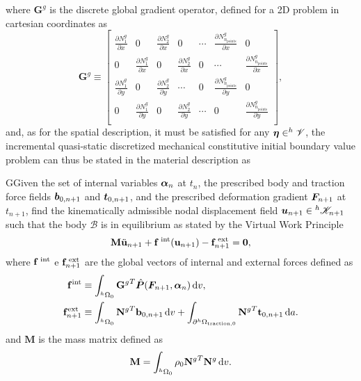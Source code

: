 where $\mathbf G^g$ is the discrete global gradient operator, defined for a 2D problem in cartesian coordinates as
\begin{equation}
    \mathbf G^g\equiv \left[
    \begin{array}{ccccccc}
         \displaystyle{\frac{\partial N_1^g}{\partial x}} & 0 & \displaystyle{\frac{\partial N_2^g}{\partial x}} & 0 & \cdots &
         \displaystyle{\frac{\partial N_{n_\text{points}}^g}{\partial x}} & 0\\
         0 & \displaystyle{\frac{\partial N_1^g}{\partial x}} & 0 & \displaystyle{\frac{\partial N_2^g}{\partial x}} & 0 & \cdots &
         \displaystyle{\frac{\partial N_{n_\text{points}}^g}{\partial x}}\\
         \displaystyle{\frac{\partial N_1^g}{\partial y}} & 0 & \displaystyle{\frac{\partial N_2^g}{\partial y}} & \cdots &
         0 & \displaystyle{\frac{\partial N_{n_\text{points}}^g}{\partial y}} & 0\\
         0 & \displaystyle{\frac{\partial N_1^g}{\partial y}} & 0 & \displaystyle{\frac{\partial N_2^g}{\partial y}} & \cdots &
         0 & \displaystyle{\frac{\partial N_{n_\text{points}}^g}{\partial y}}\\
    \end{array}
    \right],
\end{equation}
and, as for the spatial description, it must  be satisfied for any $\bm{\eta} \in ^h \mathscr{V}$, the incremental quasi-static discretized mechanical constitutive initial boundary value problem can thus be stated in the material description as
\begin{problem}
GGiven the set of internal variables $\bm{\alpha}_n$ at $t_n$, the prescribed body and traction force fields $\bm{b}_{0,n+1}$ and $\bm{t}_{0,n+1}$, and the prescribed deformation gradient $\bm{F}_{n+1}$ at $t_{n+1}$, find the kinematically admissible nodal displacement field $\bm{u}_{n+1}\in {^h\mathscr{K}_{n+1}}$ such that the body $\mathscr{B}$ is in equilibrium as stated by the Virtual Work Principle
\begin{equation}
    \mathbf M \ddot{\mathbf u}_{n+1} +\mathbf f^\text{\;int}(\mathbf u_{n+1})-\mathbf f^\text{\;ext}_{n+1}=\mathbf 0, \label{eq:equilibrium_material}
\end{equation}
where $\mathbf f^\text{\;int}$ e $\mathbf f^\text{\;ext}_{n+1}$ are the global vectors of internal and external forces defined as
\begin{align}
    \mathbf f^\text{int} &\equiv \int_{^h\Omega_0}{\mathbf G^g}^T \hat{\bm{P}}(\bm{F}_{n+1}, \bm{\alpha}_n)\,\mathrm{d} v,\\
    \mathbf f^\text{ext}_{n+1} &\equiv \int_{^h\Omega_0}{\mathbf N^g}^T \mathbf b_{0,n+1}\,\mathrm{d} v + \int_{\partial^h\Omega_\text{traction,0}}{\mathbf N^g}^T \mathbf t_{0,n+1}\,\mathrm{d} a.
\end{align}
and $\mathbf M$ is the mass matrix defined as
\begin{equation}
  \mathbf M = \int_{{}^h\Omega_0} \rho_0 {\mathbf{N}^g}^T\mathbf{N}^g \,\mathrm{d} v.
\end{equation}
\end{problem}

